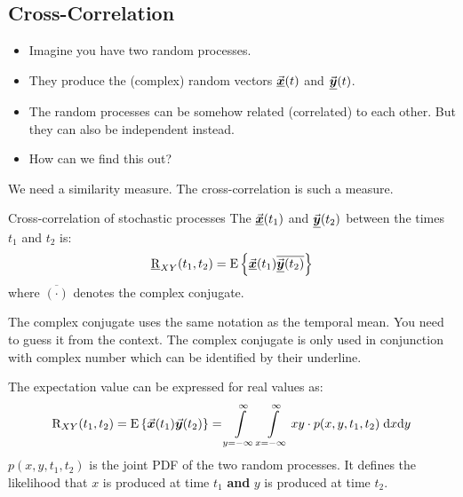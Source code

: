 \begin{refsection}
\subsection{Cross-Correlation}

\begin{itemize}
	\item Imagine you have two random processes.
	\item They produce the (complex) random vectors $\vec{\bm{\underline{x}}}(t)$ and $\vec{\bm{\underline{y}}}(t)$.
	\item The random processes can be somehow related (correlated) to each other. But they can also be independent instead.
	\item How can we find this out?
\end{itemize}

We need a similarity measure. The cross-correlation is such a measure.

\begin{definition}{Cross-correlation of stochastic processes}
	The   $\vec{\bm{\underline{x}}}(t_1)$ and $\vec{\bm{\underline{y}}}(t_2)$ between the times $t_1$ and $t_2$ is:
	\begin{equation}
		\underline{\mathrm{R}}_{XY}(t_1, t_2) = \mathrm{E}\left\{ \vec{\bm{\underline{x}}}(t_1) \overline{\vec{\bm{\underline{y}}}(t_2)} \right\}
	\end{equation}%
	where $\overline{\left(\cdot\right)}$ denotes the complex conjugate.
\end{definition}

\begin{attention}
	The complex conjugate uses the same notation as the temporal mean. You need to guess it from the context. The complex conjugate is only used in conjunction with complex number which can be identified by their underline.
\end{attention}

The expectation value can be expressed for real values as:
\begin{equation}
	\mathrm{R}_{XY}(t_1, t_2) = \mathrm{E}\left\{ \vec{\bm{x}}(t_1) \vec{\bm{y}}(t_2) \right\} = \int\limits_{y = -\infty}^{\infty} \int\limits_{x = -\infty}^{\infty} x y \cdot p(x, y, t_1, t_2) \; \mathrm{d} x \mathrm{d} y
\end{equation}
$p(x, y, t_1, t_2)$ is the joint \ac{PDF} of the two random processes. It defines the likelihood that $x$ is produced at time $t_1$ \textbf{and} $y$ is produced at time $t_2$.


\end{refsection}
